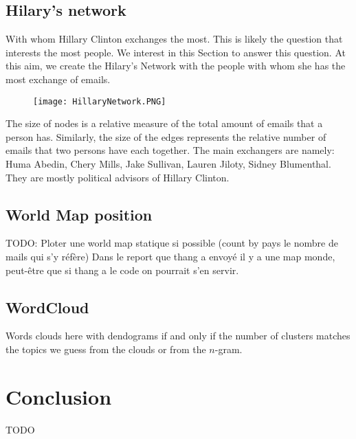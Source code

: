 \documentclass[11pt]{article}
\begin{document}
\subsection{Hilary's network}
With whom Hillary Clinton exchanges the most. This is likely the question that interests the most people. We interest in this Section to answer this question. At this aim, we create the Hilary's Network with the people with whom she has the most exchange of emails.
\begin{figure}[h]
	\centering
	\texttt{[image: HillaryNetwork.PNG]}
\end{figure}
The size of nodes is a relative measure of the total amount of emails that a person has. Similarly, the size of the edges represents the relative number of emails that two persons have each together. The main exchangers are namely: Huma Abedin, Chery Mills, Jake Sullivan, Lauren Jiloty, Sidney Blumenthal. They are mostly political advisors of Hillary Clinton.

\subsection{World Map position}

TODO: Ploter une world map statique si possible (count by pays le nombre de mails qui s'y réfère) Dans le report que thang a envoyé il y a une map monde, peut-être que si thang a le code on pourrait s'en servir.

\subsection{WordCloud}

Words clouds here with dendograms if and only if the number of clusters matches the topics we guess from the clouds or from the $n$-gram.

\section{Conclusion}

TODO
\end{document}
